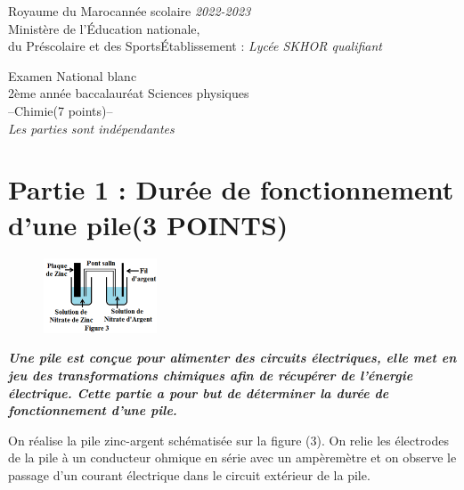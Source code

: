 \documentclass[12pt]{article}
\newcommand\headerMe[2]{\noindent{}#1\hfill#2}
\begin{document}
\headerMe{Royaume du Maroc}{année scolaire \emph{2022-2023}}\\
\headerMe{Ministère de l'Éducation nationale, }{  }\\
\headerMe{du Préscolaire et des Sports}{Établissement : \emph{Lycée SKHOR qualifiant}}\\
\begin{center}
	Examen National blanc\\
    2ème année baccalauréat Sciences physiques\\
    \vspace{.2cm}
\hrulefill
\Large{--Chimie(7 points)--}
\hrulefill\\

    \emph{Les  parties sont indépendantes}
\end{center}

 \section*{Partie 1 : Durée de fonctionnement d'une pile\dotfill (3 POINTS)  }
\begin{figure}
	\vspace{-1.2cm}
\begin{center}
	\includegraphics[width=0.3\textwidth]{./img/chimie1.png}
\end{center}
\end{figure}

 \emph{ \textbf{ Une pile est conçue pour alimenter des circuits électriques, elle met en jeu des transformations
chimiques afin de récupérer de l'énergie électrique.
Cette partie a pour but de déterminer la durée de fonctionnement d'une pile.
}}

On réalise la pile zinc-argent schématisée sur la figure (3). On relie les électrodes de la
pile à un conducteur ohmique en série avec un ampèremètre et on observe le passage d’un
courant électrique dans le circuit extérieur de la pile.
\end{document}
